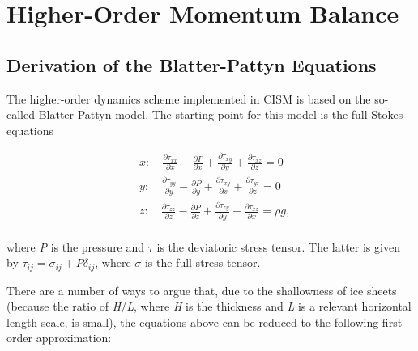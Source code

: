 %
%
%
%
%
%

\section{Higher-Order Momentum Balance}

\subsection{Derivation of the Blatter-Pattyn Equations}

The higher-order dynamics scheme implemented in CISM is based on the so-called Blatter-Pattyn model. The starting point for this model is the full Stokes equations

\begin{align*}
  & x:\quad \frac{\partial \tau _{xx}}{\partial x}-\frac{\partial P}{\partial x}+\frac{\partial \tau _{xy}}{\partial y}+\frac{\partial \tau _{xz}}{\partial z}=0 \\ 
 & y:\quad \frac{\partial \tau _{yy}}{\partial y}-\frac{\partial P}{\partial y}+\frac{\partial \tau _{xy}}{\partial x}+\frac{\partial \tau _{yz}}{\partial z}=0 \\ 
 & z:\quad \frac{\partial \tau _{zz}}{\partial z}-\frac{\partial P}{\partial z}+\frac{\partial \tau _{zy}}{\partial y}+\frac{\partial \tau _{xz}}{\partial x}=\rho g, \\ 
\end{align*}

where \textit{P} is the pressure and {\large \(\tau{}\)} is the deviatoric stress tensor. The latter is given by $\tau _{ij}=\sigma _{ij}+P\delta _{ij}$, 
where {\large \(\sigma{}\)} is the full stress tensor.

There are a number of ways to argue that, due to the shallowness of ice sheets (because the ratio of \textit{H}/\textit{L}, where \textit{H} is the thickness and \textit{L} is a relevant horizontal length scale, is small), the equations above can be reduced to the following first-order approximation:

